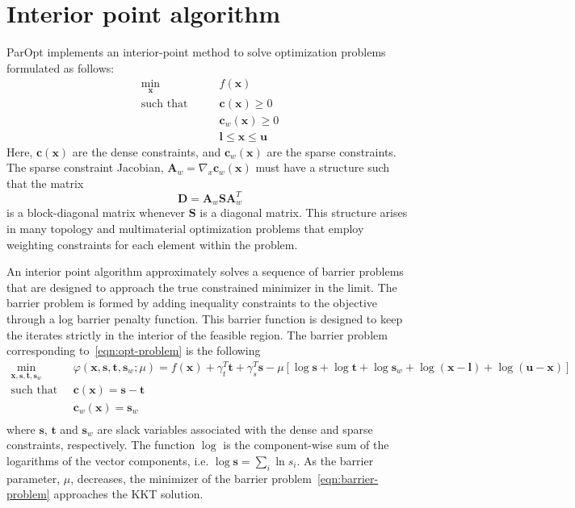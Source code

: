 \documentclass[12pt]{article}
\newcommand{\mb}{\mathbf}
\begin{document}
\section{Interior point algorithm}

ParOpt implements an interior-point method to solve optimization problems formulated as follows:
\begin{equation}
  \label{eqn:opt-problem}
  \begin{aligned}
    \min_{\mb{x}} \qquad & f(\mb{x}) \\
    \text{such that} \qquad
    & \mb{c}(\mb{x}) \ge 0 \\
    & \mb{c}_{w}(\mb{x}) \ge 0 \\
    & \mb{l} \le \mb{x} \le \mb{u}
  \end{aligned}
\end{equation}
Here, $\mb{c}(\mb{x})$ are the dense constraints, and $\mb{c}_{w}(\mb{x})$ are the sparse constraints.
The sparse constraint Jacobian, $\mb{A}_{w} = \nabla_{x} \mb{c}_{w}(\mb{x})$ must have a structure such that the matrix
\begin{equation*}
  \mb{D} = \mb{A}_{w}\mb{S}\mb{A}_{w}^{T}
\end{equation*}
is a block-diagonal matrix whenever $\mb{S}$ is a diagonal matrix.
This structure arises in many topology and multimaterial optimization problems that employ weighting constraints for each element within the problem.

An interior point algorithm approximately solves a sequence of barrier problems that are designed to approach the true constrained minimizer in the limit.
The barrier problem is formed by adding inequality constraints to the objective through a log barrier penalty function.
This barrier function is designed to keep the iterates strictly in the interior of the feasible region.
The barrier problem corresponding to~\eqref{eqn:opt-problem} is the following
\begin{equation}
  \label{eqn:barrier-problem}
  \begin{aligned}
    \min_{\mb{x}, \mb{s}, \mb{t}, \mb{s}_{w}} \qquad &  \varphi(\mb{x}, \mb{s}, \mb{t}, \mb{s}_{w}; \mu) =
    f(\mb{x}) + \gamma_{t}^{T}\mb{t} + \gamma_{s}^{T}\mb{s} - \mu \left[ \log \mb{s} + \log \mb{t} + \log \mb{s}_{w} + \log (\mb{x} - \mb{l}) + \log (\mb{u} - \mb{x})  \right] \\
    \text{such that} \qquad & \mb{c}(\mb{x}) = \mb{s} - \mb{t} \\
    & \mb{c}_{w}(\mb{x}) = \mb{s}_{w} \\
  \end{aligned}
\end{equation}
where $\mb{s}$, $\mb{t}$ and $\mb{s}_{w}$ are slack variables associated with the dense and sparse constraints, respectively.
The function $\log$ is the component-wise sum of the logarithms of the vector components, i.e. $\log \mb{s} = \sum_{i} \ln s_{i}$.
As the barrier parameter, $\mu$, decreases, the minimizer of the barrier problem~\eqref{eqn:barrier-problem} approaches the KKT solution.
\end{document}
